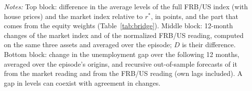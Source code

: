 \begin{table}[tbp]\centering
\caption{Two Readings of Three Episodes}\label{tab:epmain}
\begin{flushleft}\footnotesize\textit{Notes:} Top block: difference in the average levels of the full FRB/US index (with house prices) and the market index relative to $r^*$, in points, and the part that comes from the equity weights (Table~\ref{tab:bridge}). Middle block: 12-month changes of the market index and of the normalized FRB/US reading, computed on the same three assets and averaged over the episode; $D$ is their difference. Bottom block: change in the unemployment gap over the following 12 months, averaged over the episode's origins, and recursive out-of-sample forecasts of it from the market reading and from the FRB/US reading (own lags included). A gap in levels can coexist with agreement in changes.\end{flushleft}
\end{table}
